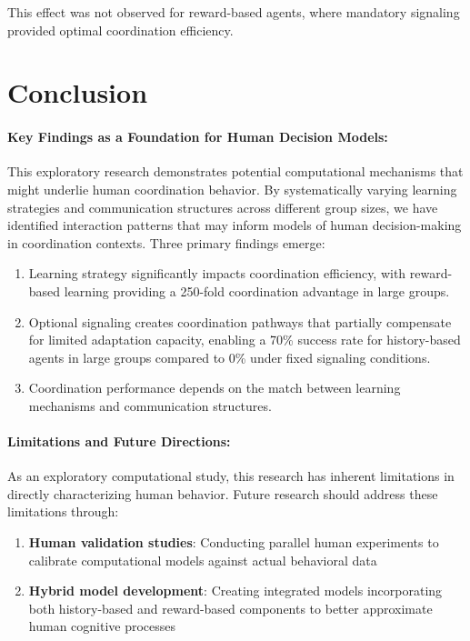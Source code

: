 \documentclass[12pt,a4paper]{article}
\begin{document}
This effect was not observed for reward-based agents, where mandatory signaling provided optimal coordination efficiency.

\section{Conclusion}

\paragraph{Key Findings as a Foundation for Human Decision Models:} 
This exploratory research demonstrates potential computational mechanisms that might underlie human coordination behavior. By systematically varying learning strategies and communication structures across different group sizes, we have identified interaction patterns that may inform models of human decision-making in coordination contexts. Three primary findings emerge:

\begin{enumerate}
    \item Learning strategy significantly impacts coordination efficiency, with reward-based learning providing a 250-fold coordination advantage in large groups.
    
    \item Optional signaling creates coordination pathways that partially compensate for limited adaptation capacity, enabling a 70\% success rate for history-based agents in large groups compared to 0\% under fixed signaling conditions.
    
    \item Coordination performance depends on the match between learning mechanisms and communication structures.
\end{enumerate}

\paragraph{Limitations and Future Directions:} 
As an exploratory computational study, this research has inherent limitations in directly characterizing human behavior. Future research should address these limitations through:

\begin{enumerate}
    \item \textbf{Human validation studies}: Conducting parallel human experiments to calibrate computational models against actual behavioral data
    
    \item \textbf{Hybrid model development}: Creating integrated models incorporating both history-based and reward-based components to better approximate human cognitive processes
\end{enumerate}
\end{document}
